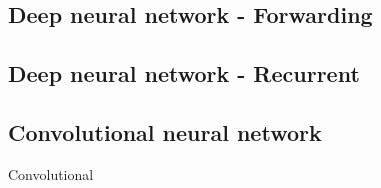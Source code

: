 \subsection{Deep neural network - Forwarding}
\subsection{Deep neural network - Recurrent}
\subsection{Convolutional neural network}
Convolutional 